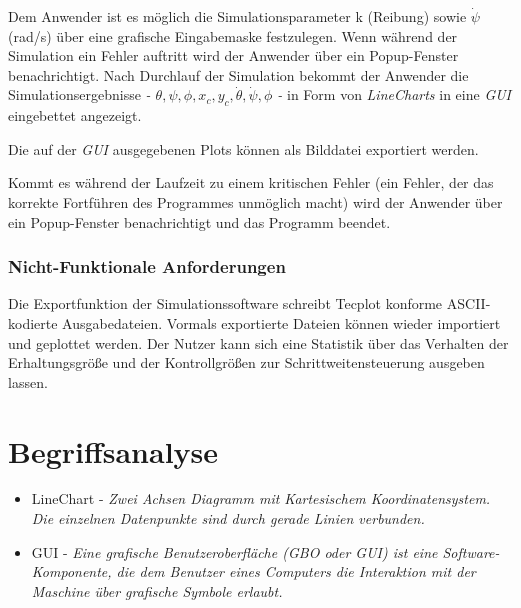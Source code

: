 {Dem Anwender ist es m\"oglich die Simulationsparameter k (Reibung) sowie 
$ \dot \psi $ (rad/s) \"uber eine grafische Eingabemaske festzulegen. 
Wenn w\"ahrend der Simulation ein Fehler auftritt wird der Anwender 
\"uber ein Popup-Fenster benachrichtigt. Nach Durchlauf der Simulation
bekommt der Anwender die Simulationsergebnisse 
\textit{ - $\theta, \psi, \phi, x_c, y_c, \dot \theta, \dot \psi, 
\phi$ -} in Form von \textit{LineCharts} in eine \textit{GUI} 
eingebettet angezeigt.} 

Die auf der \textit{GUI} ausgegebenen Plots k\"onnen als Bilddatei exportiert werden. \medskip

Kommt es w\"ahrend der Laufzeit zu einem kritischen Fehler (ein Fehler, der das korrekte Fortf\"uhren des Programmes unm\"oglich macht) wird der Anwender \"uber ein Popup-Fenster benachrichtigt und das Programm beendet.
\medskip

\subsubsection{Nicht-Funktionale Anforderungen}
{
Die Exportfunktion der Simulationssoftware schreibt Tecplot konforme ASCII-kodierte Ausgabedateien.
Vormals exportierte Dateien k\"onnen wieder importiert und geplottet werden.
Der Nutzer kann sich eine Statistik \"uber das Verhalten der Erhaltungsgr\"o\ss e und der Kontrollgr\"o\ss en zur Schrittweitensteuerung ausgeben lassen.  
}



\section{Begriffsanalyse}
\begin{itemize}
\item LineChart - \textit{Zwei Achsen Diagramm mit Kartesischem Koordinatensystem. Die einzelnen Datenpunkte sind durch gerade Linien verbunden.} 
\item GUI - \textit{Eine grafische Benutzeroberfl\"ache (GBO oder GUI) ist eine Software-Komponente, die dem Benutzer eines Computers die Interaktion mit der Maschine \"uber grafische Symbole erlaubt.} 
\end{itemize}




